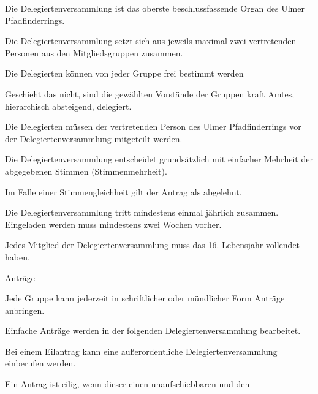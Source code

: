 \begin{legal}
        \begin{legal}
            \item Die Delegiertenversammlung ist das oberste beschlussfassende Organ
                  des Ulmer Pfadfinderrings.
            \item Die Delegiertenversammlung setzt sich aus jeweils maximal zwei 
                  vertretenden Personen aus den Mitgliedsgruppen zusammen.
                \begin{legal}
                    \item Die Delegierten können von jeder Gruppe frei bestimmt werden 
                    \item Geschieht das nicht, sind die gewählten Vorstände der Gruppen kraft Amtes, 
                          hierarchisch absteigend, delegiert.
                    \item Die Delegierten müssen der vertretenden Person des Ulmer 
                          Pfadfinderrings vor der Delegiertenversammlung mitgeteilt werden.
                \end{legal}
            \item Die Delegiertenversammlung entscheidet grundsätzlich mit einfacher Mehrheit der 
                  abgegebenen Stimmen (Stimmenmehrheit).
            \item Im Falle einer Stimmengleichheit gilt der Antrag als abgelehnt.
            \item Die Delegiertenversammlung tritt mindestens einmal jährlich zusammen.
                  Eingeladen werden muss mindestens zwei Wochen vorher.
            \item Jedes Mitglied der Delegiertenversammlung muss das 16. Lebensjahr vollendet haben.
            \item Anträge
                \begin{legal}
                    \item Jede Gruppe kann jederzeit in schriftlicher oder mündlicher Form Anträge 
                          anbringen.
                    \item Einfache Anträge werden in der folgenden Delegiertenversammlung 
                          bearbeitet.
                \end{legal}
            \item Bei einem Eilantrag kann eine außerordentliche Delegiertenversammlung 
                  einberufen werden.
                  \begin{legal}
                      \item Ein Antrag ist eilig, wenn dieser einen unaufschiebbaren und den 

\end{legal}
\end{legal}
\end{legal}

